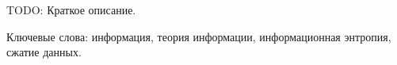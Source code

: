 \begin{essay}{}

TODO: Краткое описание.

Ключевые слова: информация, теория информации, информационная энтропия, сжатие данных.

\end{essay}